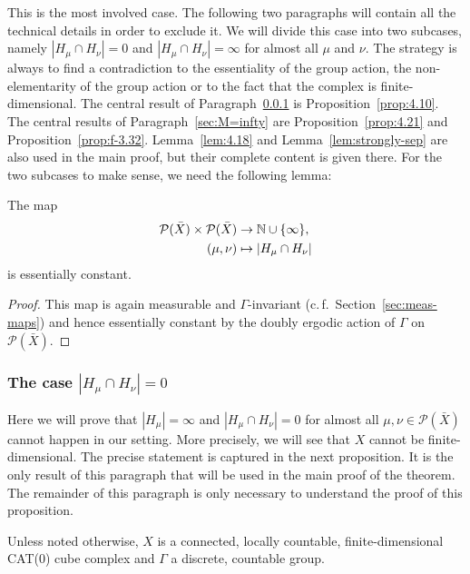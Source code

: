 This is the most involved case. The following two paragraphs will contain all the technical details in order to exclude it. We will divide this case into two subcases, namely \(|H_\mu \cap H_\nu| = 0\) and \(|H_\mu \cap H_\nu| = \infty\) for almost all \(\mu\) and \(\nu\). The strategy is always to find a contradiction to the essentiality of the group action, the non-elementarity of the group action or to the fact that the complex is finite-dimensional. The central result of Paragraph~\ref{sec:M=0} is Proposition~\ref{prop:4.10}. The central results of Paragraph~\ref{sec:M=infty} are Proposition~\ref{prop:4.21} and Proposition~\ref{prop:f-3.32}. Lemma~\ref{lem:4.18} and Lemma~\ref{lem:strongly-sep} are also used in the main proof, but their complete content is given there.
For the two subcases to make sense, we need the following lemma:

\begin{lemma}
  \label{lem:hh-const}
  The map
  \begin{align*}
    \mathcal{P}(\bar X) \times \mathcal{P}(\bar X) &\to \mathbb{N} \cup \{\infty\},\\
    (\mu, \nu) &\mapsto |H_\mu \cap H_\nu|
  \end{align*}
  is essentially constant.
\end{lemma}

\begin{proof}
  This map is again measurable and \(\Gamma\)-invariant (c.\,f.~Section~\ref{sec:meas-maps}) and hence essentially constant by the doubly ergodic action of \(\Gamma\) on \(\mathcal{P}(\bar X)\).
\end{proof}

\subsubsection{The case \(|H_\mu \cap H_\nu| = 0\)}
\label{sec:M=0}

Here we will prove that \(|H_\mu| = \infty\) and \(|H_\mu \cap H_\nu| = 0\) for almost all \(\mu, \nu \in \mathcal{P}(\bar X)\) cannot happen in our setting. More precisely, we will see that \(X\) cannot be finite-dimensional. The precise statement is captured in the next proposition. It is the only result of this paragraph that will be used in the main proof of the theorem. The remainder of this paragraph is only necessary to understand the proof of this proposition.

Unless noted otherwise, \(X\) is a connected, locally countable, finite-dimensional CAT(0) cube complex and \(\Gamma\) a discrete, countable group.

